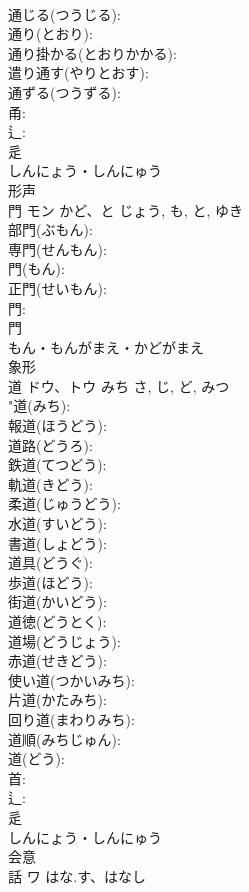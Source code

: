 \documentclass[8pt]{extreport}
\begin{document}
\begin{CJK}{UTF8}{min}
\\	通じる(つうじる): 
\\	通り(とおり): 
\\	通り掛かる(とおりかかる): 
\\	遣り通す(やりとおす): 
\\	通ずる(つうずる): 
\\	甬: 
\\	辶: 
\\	辵	
\\	しんにょう・しんにゅう	
\\	形声 
\\	門	モン	かど、と	じょう, も, と, ゆき	
\\	部門(ぶもん): 
\\	専門(せんもん): 
\\	門(もん): 
\\	正門(せいもん): 
\\	門: 
\\	門	
\\	もん・もんがまえ・かどがまえ	
\\	象形 
\\	道	ドウ、トウ	みち	さ, じ, ど, みつ	
\\	"道(みち): 
\\	報道(ほうどう): 
\\	道路(どうろ): 
\\	鉄道(てつどう): 
\\	軌道(きどう): 
\\	柔道(じゅうどう): 
\\	水道(すいどう): 
\\	書道(しょどう): 
\\	道具(どうぐ): 
\\	歩道(ほどう): 
\\	街道(かいどう): 
\\	道徳(どうとく): 
\\	道場(どうじょう): 
\\	赤道(せきどう): 
\\	使い道(つかいみち): 
\\	片道(かたみち): 
\\	回り道(まわりみち): 
\\	道順(みちじゅん): 
\\	道(どう): 
\\	首: 
\\	辶: 
\\	辵	
\\	しんにょう・しんにゅう	
\\	会意 
\\	話	ワ	はな.す、はなし		

\end{CJK}
\end{document}
